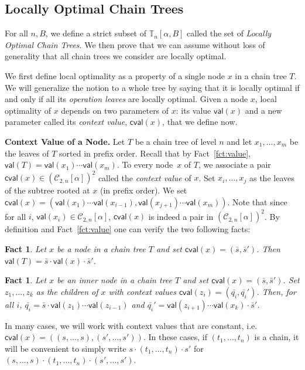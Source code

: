 \documentclass[envcountsame]{llncs}
\newcommand\Cs{\ensuremath{\mathcal{C}}\xspace}
\newcommand\Cstwolen[1]{\ensuremath{\Cs_{2,#1}}\xspace}
\newcommand\Cstwon{\ensuremath{\Cstwolen{n}}\xspace}
\newcommand\ct{\ensuremath{\mathbb{T}}\xspace}
\newcommand\val[1]{\ensuremath{\textsf{val}(#1)\xspace}}
\newcommand\cval[1]{\ensuremath{\textsf{cval}(#1)\xspace}}
\newcommand\chain{chain\xspace}
\newcommand\Chain{Chain\xspace}
\newtheorem{fact}[theorem]{Fact}
\begin{document}
\subsection{Locally Optimal \Chain Trees}

For all $n,B$, we define a strict subset of $\ct_n[\alpha,B]$ called 
the set of \emph{Locally Optimal \Chain Trees}. We then prove that
we can assume without loss of generality that all \chain trees we
consider are locally optimal.

We first define local optimality as a property of a single node $x$ 
in a \chain tree $T$. We will generalize the notion to a whole tree
by saying that it is locally optimal if and only if all its
\emph{operation leaves} are locally optimal. Given a node $x$, local
optimality of $x$ depends on two parameters of $x$: its value
$\val{x}$ and a new parameter called its \emph{context value},
$\cval{x}$, that we define now. 

\medskip
\noindent
{\bf Context Value of a Node.} Let $T$ be a \chain tree of level $n$
and let $x_1,\dots,x_m$ be the leaves of $T$ sorted in prefix
order. Recall that by Fact~\ref{fct:value}, $\val{T} = \val{x_1}
\cdots \val{x_m}$. To every node~$x$ of $T$, we associate a
pair $\cval{x} \in (\Cstwon[\alpha])^2$ called the \emph{context 
  value} of $x$. Set $x_{i},\dots,x_j$ as the leaves of the subtree
rooted at $x$ (in prefix order). We set $\cval{x} = (\val{x_1}
\cdots \val{x_{i-1}},\val{x_{j+1}} \cdots \val{x_m})$. Note that since
for all $i$, $\val{x_i} \in \Cstwon[\alpha]$, $\cval{x}$ is indeed a
pair in $(\Cstwon[\alpha])^2$. By definition and Fact~\ref{fct:value}
one can verify the two following facts:



\begin{fact} \label{fct:value2}
  Let $x$ be a node in a \chain tree $T$ and set $\cval{x}
  =(\bar{s},\bar{s}')$. Then $\val{T} = \bar{s} \cdot \val{x}
  \cdot \bar{s}'$.
\end{fact}
\begin{fact} \label{fct:value3}
  Let $x$ be an inner node in a \chain tree $T$ and set $\cval{x} =
  (\bar{s},\bar{s}')$.  Set $z_1,\dots,z_k$ as the children of $x$ with
  context values $\cval{z_i} = (\bar{q_i},\bar{q_i}')$. Then, for all
  $i$, $\bar{q_i} =  \bar{s} \cdot \val{z_1} \cdots \val{z_{i-1}}$ and
  $\bar{q_i}' = \val{z_{i+1}} \cdots \val{x_{k}} \cdot \bar{s}'$.
\end{fact}

In many cases, we will work with context values that are constant,
i.e. $\cval{x} = ((s,\dots,s),(s',\dots,s'))$. In these cases, if
$(t_1,\dots,t_n)$ is a \chain, it will be convenient to simply write
$s \cdot (t_1,\dots,t_n) \cdot s'$ for $(s,\dots,s) \cdot (t_1,
\dots,t_n) \cdot (s',\dots,s')$.
\end{document}
